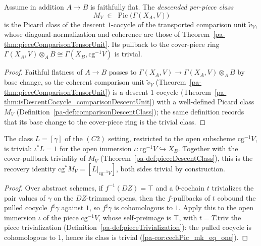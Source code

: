 \begin{theorem}
  \label{pa-def:pieceDescentClass}
  \leanok

  Assume in addition \(A \to B\) is faithfully flat. The \emph{descended per-piece class}
  \[
    M_V \;\in\; \operatorname{Pic}\bigl(\Gamma(X_A, V)\bigr)
  \]
  is the Picard class of the descent \(1\)-cocycle of the transported comparison unit \(\tilde v_V\),
  whose diagonal-normalization and coherence are those of
  Theorem~\ref{pa-thm:pieceComparisonTensorUnit}. Its pullback to the cover-piece ring \(\Gamma(X_A, V)
  \otimes_A B \cong \Gamma(X_B, \mathrm{cg}^{-1}V)\) is trivial.
\end{theorem}
\begin{proof}
  \leanok
  Faithful flatness of \(A \to B\) passes to \(\Gamma(X_A, V) \to \Gamma(X_A, V) \otimes_A B\) by
  base change, so the coherent comparison unit \(\tilde v_V\)
  (Theorem~\ref{pa-thm:pieceComparisonTensorUnit}) is a descent \(1\)-cocycle
  (Theorem~\ref{pa-thm:isDescentCocycle_comparisonDescentUnit}) with a well-defined Picard class
  \(M_V\) (Definition~\ref{pa-def:comparisonDescentClass}); the same definition records that its base
  change to the cover-piece ring is the trivial class.
\end{proof}

\begin{theorem}
  \label{pa-thm:cechPicMap_pieceI_eq_one}
  \leanok

  The class \(L = [\gamma]\) of the \((C2)\) setting, restricted to the open subscheme
  \(\mathrm{cg}^{-1}V\), is trivial: \(\iota^{*}L = 1\) for the open immersion \(\iota \colon
  \mathrm{cg}^{-1}V \hookrightarrow X_B\). Together with the cover-pullback triviality of
  \(M_V\) (Theorem~\ref{pa-def:pieceDescentClass}), this is the recovery identity \(\mathrm{cg}^{*}M_V
  = [L|_{\mathrm{cg}^{-1}V}]\), both sides trivial by construction.
\end{theorem}
\begin{proof}
  \leanok
  Over abstract schemes, if \(f^{-1}(DZ) = \top\) and a \(0\)-cochain \(t\) trivializes the pair
  values of \(\gamma\) on the \(DZ\)-trimmed opens, then the \(f\)-pullbacks of \(t\) cobound the
  pulled cocycle \(f^{\sharp}\gamma\) against \(1\), so \(f^{\sharp}\gamma\) is cohomologous to
  \(1\). Apply this to the open immersion \(\iota\) of the piece \(\mathrm{cg}^{-1}V\), whose
  self-preimage is \(\top\), with \(t = T.\mathrm{triv}\) the piece trivialization
  (Definition~\ref{pa-def:pieceTrivialization}): the pulled cocycle is cohomologous to \(1\), hence its
  class is trivial (\ref{pa-cor:cechPic_mk_eq_one}).
\end{proof}

